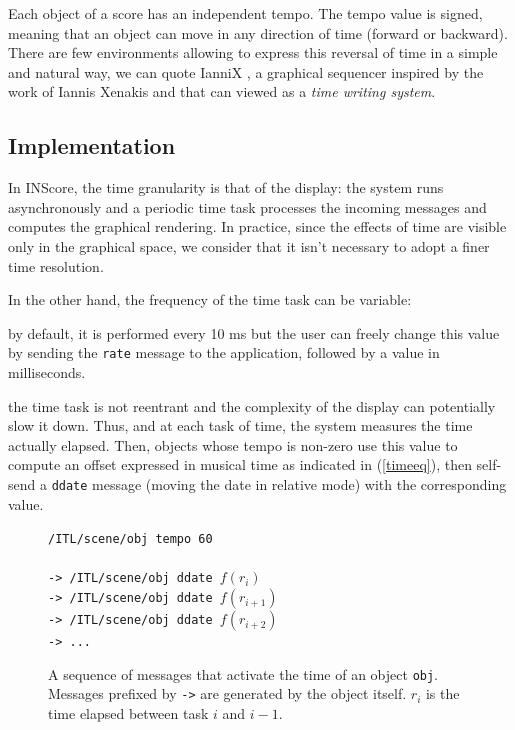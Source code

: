 \documentclass{article}
\newcommand{\OSC}[1]	{{\fontsize{9pt}{9pt} \selectfont\texttt{#1}}}
\let\olditemize\itemize
\let\oldenditemize\enditemize
\renewenvironment{itemize} 	{\olditemize \renewcommand{\labelitemi}{$\bullet$} \setlength{\itemsep}{0mm}}{\oldenditemize}
\newcommand{\sample}[1]		{\vspace{-0.2em}\begin{center}\colorbox{mygrey}{\begin{minipage}[t]{0.98\columnwidth} {\small \texttt{#1}}\end{minipage}}\end{center}}
\begin{document}
Each object of a score has an independent tempo. The tempo value is signed, meaning that an object can move in any direction of time (forward or backward). There are few environments allowing to express this reversal of time in a simple and natural way, we can quote IanniX \cite{iannix14}, a graphical sequencer inspired by the work of Iannis Xenakis and that can viewed as a \emph{time writing system}.


\subsection{Implementation}

In INScore, the time granularity is that of the display: the system runs asynchronously and a periodic time task processes the incoming messages and computes the graphical rendering. In practice, since the effects of time are visible only in the graphical space, we consider that it isn't necessary to adopt a finer time resolution.

In the other hand, the frequency of the time task can be variable:
\begin{itemize}
\item by default, it is performed every 10 ms but the user can freely change this value by sending the \OSC{rate} message to the application, followed by a value in milliseconds.
\item the time task is not reentrant and the complexity of the display can potentially slow it down.
\end{itemize}
Thus, and at each task of time, the system measures the time actually elapsed. Then, objects whose tempo is non-zero use this value to compute an offset expressed in musical time as indicated in (\ref{timeeq}), then self-send a \OSC{ddate} message (moving the date in relative mode) with the corresponding value.

\begin{figure}[h]
   \centering
   \sample{/ITL/scene/obj tempo 60 \\
   \\
-> /ITL/scene/obj ddate $f(r_i)$ \\
-> /ITL/scene/obj ddate $f(r_{i+1})$ \\
-> /ITL/scene/obj ddate $f(r_{i+2})$ \\
-> ...
}
   \caption{A sequence of messages that activate the time of an object \OSC{obj}. Messages prefixed by \OSC{->} are generated by the object itself. $r_{i}$ is the time elapsed between task $i$ and $i-1$.}
   \label{fig:tempo}
\end{figure}
\end{document}

